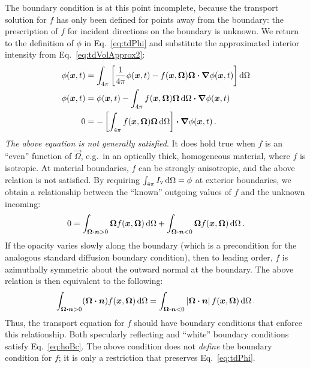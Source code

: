 The boundary condition is at this point incomplete, because the transport
solution for $f$ has only been defined for points away from the boundary: the
prescription of $f$ for incident directions on the boundary is unknown.
We return to
the definition of $\phi$ in Eq.~\eqref{eq:tdPhi} and substitute the approximated
interior intensity from Eq.~\eqref{eq:tdVolApprox2}:
\begin{align*}
  \phi(\bm{x},t) &= \int_{4\pi} \left[ 
\frac{1}{4\pi} \phi (\bm{x},t)
  - f(\bm{x}, \bm{\Omega})\bm{\Omega}\bm{\cdot} \bm{\nabla} \phi(\bm{x},t)
  \right] \mathop{}\!\mathrm{d} \Omega
  \\
  \phi(\bm{x},t) &= \phi (\bm{x},t)
  - \int_{4\pi} f(\bm{x}, \bm{\Omega})\bm{\Omega} \mathop{}\!\mathrm{d} \Omega
  \bm{\cdot} \bm{\nabla} \phi(\bm{x},t)
  \\
  0 &= - \left[ \int_{4\pi} f(\bm{x}, \bm{\Omega})\bm{\Omega} \mathop{}\!\mathrm{d}\Omega
  \right]
  \bm{\cdot} \bm{\nabla} \phi(\bm{x},t) \,.
\end{align*}
\emph{The above equation is not generally satisfied}. It does hold true when
$f$ is an ``even'' function of $\vec{\Omega}$, e.g.\ in an optically thick,
homogeneous material, where $f$ is isotropic. At material
boundaries, $f$ can be strongly anisotropic, and the above relation is not
satisfied. By requiring $\int_{4\pi} I_\mathrm{v} \mathop{}\!\mathrm{d}\Omega = \phi$ at exterior
boundaries, we
obtain a relationship between the ``known'' outgoing values of $f$ and the
unknown incoming:
\begin{equation*}
  0 =
  \int_{\bm{\Omega}\bm{\cdot}\bm{n} > 0} \bm{\Omega} f(\bm{x}, \bm{\Omega}) \mathop{}\!\mathrm{d} \Omega
 + \int_{\bm{\Omega}\bm{\cdot}\bm{n} < 0} \bm{\Omega} f(\bm{x}, \bm{\Omega}) \mathop{}\!\mathrm{d}
 \Omega\,.
\end{equation*}
If the opacity varies slowly along the boundary (which is a precondition for the
analogous standard diffusion boundary condition), then to leading order, $f$
is azimuthally symmetric about the outward normal at the boundary. The above
relation is then equivalent to the following:
\begin{equation}\label{eq:hoBc}
  \int_{\bm{\Omega}\bm{\cdot}\bm{n} > 0} (\bm{\Omega}\bm{\cdot} \bm{n})
  f(\bm{x}, \bm{\Omega}) \mathop{}\!\mathrm{d}\Omega
  =
  \int_{\bm{\Omega}\bm{\cdot}\bm{n} < 0} \left| \bm{\Omega}\bm{\cdot} \bm{n} \right|
  f(\bm{x}, \bm{\Omega}) \mathop{}\!\mathrm{d}\Omega \,.
\end{equation}
Thus, the transport equation for $f$ should have boundary conditions
that enforce this relationship. Both specularly reflecting and
``white'' boundary conditions satisfy Eq.~\eqref{eq:hoBc}.
The above condition does not \emph{define} the boundary condition for $f$; it
is only a restriction that preserves Eq.~\eqref{eq:tdPhi}.

